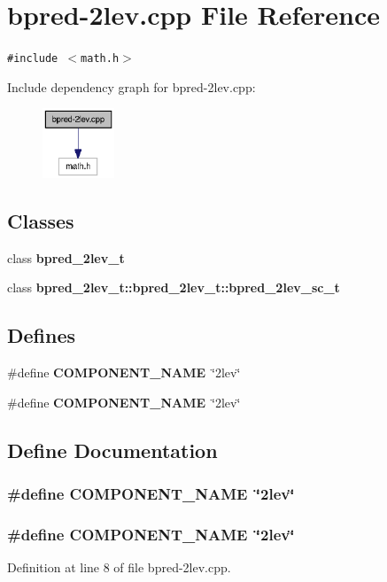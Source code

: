 \section{bpred-2lev.cpp File Reference}
\label{bpred-2lev_8cpp}
{\tt \#include $<$math.h$>$}\par


Include dependency graph for bpred-2lev.cpp:\nopagebreak
\begin{figure}[H]
\begin{center}
\leavevmode
\includegraphics[width=61pt]{bpred-2lev_8cpp__incl}
\end{center}
\end{figure}
\subsection*{Classes}
\begin{CompactItemize}
\item 
class {\bf bpred\_\-2lev\_\-t}
\item 
class {\bf bpred\_\-2lev\_\-t::bpred\_\-2lev\_\-t::bpred\_\-2lev\_\-sc\_\-t}
\end{CompactItemize}
\subsection*{Defines}
\begin{CompactItemize}
\item 
\#define {\bf COMPONENT\_\-NAME}~\char`\"{}2lev\char`\"{}
\item 
\#define {\bf COMPONENT\_\-NAME}~\char`\"{}2lev\char`\"{}
\end{CompactItemize}


\subsection{Define Documentation}
\subsubsection[{COMPONENT\_\-NAME}]{\setlength{\rightskip}{0pt plus 5cm}\#define COMPONENT\_\-NAME~\char`\"{}2lev\char`\"{}}\label{zesto-bpred_8cpp_9146ade7ce24e3db226a973a59063892}


\subsubsection[{COMPONENT\_\-NAME}]{\setlength{\rightskip}{0pt plus 5cm}\#define COMPONENT\_\-NAME~\char`\"{}2lev\char`\"{}}\label{bpred-2lev_8cpp_9146ade7ce24e3db226a973a59063892}




Definition at line 8 of file bpred-2lev.cpp.